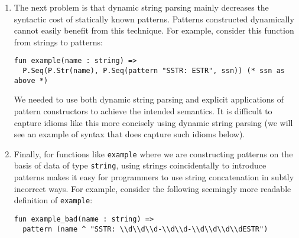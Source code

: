 \begin{enumerate}

\item The next problem is that dynamic string parsing mainly decreases the syntactic cost of statically known patterns. Patterns constructed dynamically cannot easily benefit from this technique. For example, consider this function from strings to patterns:
\begin{lstlisting}[numbers=none]
fun example(name : string) => 
  P.Seq(P.Str(name), P.Seq(pattern "SSTR: ESTR", ssn)) (* ssn as above *)
\end{lstlisting}
We needed to use both dynamic string parsing and explicit applications of pattern constructors to achieve the intended semantics. It is difficult to capture idioms like this more concisely using dynamic string parsing (we will see an example of syntax that does capture such idioms below).

\item Finally, for functions like \lstinline{example} where we are constructing patterns on the basis of data of type \lstinline{string}, using strings coincidentally to introduce patterns makes it easy for programmers to use string concatenation in subtly incorrect ways. For example, consider the following seemingly more readable definition of \lstinline{example}:
\begin{lstlisting}[numbers=none,escapechar=|]
fun example_bad(name : string) => 
  pattern (name ^ "SSTR: \\d\\d\\d-\\d\\d-\\d\\d\\d\\dESTR")
\end{lstlisting}


\end{enumerate}
